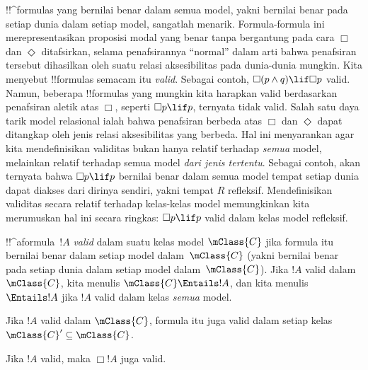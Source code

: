 \documentclass[../../../include/open-logic-section]{subfiles}
\begin{document}


\begin{explain}
  !!^{formula}s yang bernilai benar dalam semua model, yakni bernilai benar
  pada setiap dunia dalam setiap model, sangatlah menarik. Formula-formula
  ini merepresentasikan proposisi modal yang benar tanpa bergantung pada cara
  $\Box$ dan $\Diamond$ ditafsirkan, selama penafsirannya ``normal'' dalam
  arti bahwa penafsiran tersebut dihasilkan oleh suatu relasi aksesibilitas
  pada dunia-dunia mungkin. Kita menyebut !!{formula}s semacam itu
  \emph{valid}. Sebagai contoh, $\Box(p \land q) \lif \Box p$ valid. Namun,
  beberapa !!{formula}s yang mungkin kita harapkan valid berdasarkan
  penafsiran aletik atas $\Box$, seperti $\Box p \lif p$, ternyata tidak
  valid. Salah satu daya tarik model relasional ialah bahwa penafsiran
  berbeda atas $\Box$ dan $\Diamond$ dapat ditangkap oleh jenis relasi
  aksesibilitas yang berbeda. Hal ini menyarankan agar kita mendefinisikan
  validitas bukan hanya relatif terhadap \emph{semua} model, melainkan relatif
  terhadap semua model \emph{dari jenis tertentu}. Sebagai contoh, akan
  ternyata bahwa $\Box p \lif p$ bernilai benar dalam semua model tempat
  setiap dunia dapat diakses dari dirinya sendiri, yakni tempat $R$
  refleksif. Mendefinisikan validitas secara relatif terhadap kelas-kelas
  model memungkinkan kita merumuskan hal ini secara ringkas: $\Box p \lif p$
  valid dalam kelas model refleksif.
\end{explain}

\begin{defn}
  !!^a{formula}~$!A$ \emph{valid} dalam suatu kelas model $\mClass{C}$ jika
  formula itu bernilai benar dalam setiap model dalam~$\mClass{C}$ (yakni
  bernilai benar pada setiap dunia dalam setiap model dalam~$\mClass{C}$).
  Jika $!A$ valid dalam~$\mClass{C}$, kita menulis
  $\mClass{C} \Entails !A$, dan kita menulis $\Entails !A$ jika $!A$ valid
  dalam kelas \emph{semua} model.
\end{defn}

\begin{prop}
  Jika $!A$ valid dalam $\mClass{C}$, formula itu juga valid dalam setiap
  kelas $\mClass{C}' \subseteq \mClass{C}$.
\end{prop}

\begin{prop}
  Jika $!A$ valid, maka $\Box!A$ juga valid. 
\end{prop}
\end{document}
